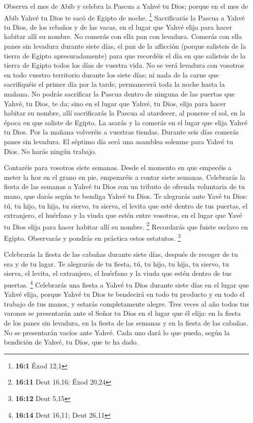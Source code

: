 \begin{paracol}{2}
 Observa el mes de Abib y celebra la Pascua a Yahvé tu
Dios; porque en el mes de Abib Yahvé tu Dios te sacó de Egipto de noche.
\footnote{\textbf{16:1} Éxod 12,1}  Sacrificarás la Pascua
a Yahvé tu Dios, de los rebaños y de las vacas, en el lugar que Yahvé
elija para hacer habitar allí su nombre.  No comerás con
ella pan con levadura. Comerás con ella panes sin levadura durante siete
días, el pan de la aflicción (porque salisteis de la tierra de Egipto
apresuradamente) para que recordéis el día en que salisteis de la tierra
de Egipto todos los días de vuestra vida.  No se verá
levadura con vosotros en todo vuestro territorio durante los siete días;
ni nada de la carne que sacrifiquéis el primer día por la tarde,
permanecerá toda la noche hasta la mañana.  No podrás
sacrificar la Pascua dentro de ninguna de las puertas que Yahvé, tu
Dios, te da;  sino en el lugar que Yahvé, tu Dios, elija
para hacer habitar su nombre, allí sacrificarás la Pascua al atardecer,
al ponerse el sol, en la época en que saliste de Egipto. 
La asarás y la comerás en el lugar que elija Yahvé tu Dios. Por la
mañana volveréis a vuestras tiendas.  Durante seis días
comerás panes sin levadura. El séptimo día será una asamblea solemne
para Yahvé tu Dios. No harás ningún trabajo.

 Contaréis para vosotros siete semanas. Desde el momento
en que empecéis a meter la hoz en el grano en pie, empezaréis a contar
siete semanas.  Celebrarás la fiesta de las semanas a
Yahvé tu Dios con un tributo de ofrenda voluntaria de tu mano, que darás
según te bendiga Yahvé tu Dios.  Te alegrarás ante Yavé
tu Dios: tú, tu hijo, tu hija, tu siervo, tu sierva, el levita que esté
dentro de tus puertas, el extranjero, el huérfano y la viuda que estén
entre vosotros, en el lugar que Yavé tu Dios elija para hacer habitar
allí su nombre. \footnote{\textbf{16:11} Deut 16,16; Éxod 20,24}
 Recordarás que fuiste esclavo en Egipto. Observarás y
pondrás en práctica estos estatutos. \footnote{\textbf{16:12} Deut 5,15}

 Celebrarás la fiesta de las cabañas durante siete días,
después de recoger de tu era y de tu lagar.  Te alegrarás
de tu fiesta, tú, tu hijo, tu hija, tu siervo, tu sierva, el levita, el
extranjero, el huérfano y la viuda que estén dentro de tus puertas.
\footnote{\textbf{16:14} Deut 16,11; Deut 26,11} 
Celebrarás una fiesta a Yahvé tu Dios durante siete días en el lugar que
Yahvé elija, porque Yahvé tu Dios te bendecirá en todo tu producto y en
todo el trabajo de tus manos, y estarás completamente alegre.
 Tres veces al año todos tus varones se presentarán ante
el Señor tu Dios en el lugar que él elija: en la fiesta de los panes sin
levadura, en la fiesta de las semanas y en la fiesta de las cabañas. No
se presentarán vacíos ante Yahvé.  Cada uno dará lo que
pueda, según la bendición de Yahvé, tu Dios, que te ha dado.


\end{paracol}
